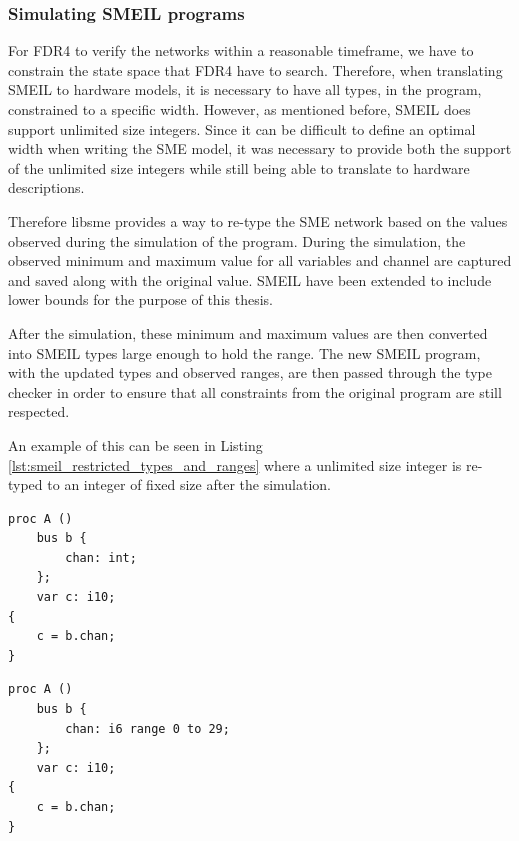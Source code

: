 \subsubsection{Simulating SMEIL programs}
For FDR4 to verify the networks within a reasonable timeframe, we have to constrain the state space that FDR4 have to search. Therefore, when translating SMEIL to hardware models, it is necessary to have all types, in the program, constrained to a specific width. However, as mentioned before, SMEIL does support unlimited size integers. Since it can be difficult to define an optimal width when writing the SME model, it was necessary to provide both the support of the unlimited size integers while still being able to translate to hardware descriptions.

Therefore libsme provides a way to re-type the SME network based on the values observed during the simulation of the program.
During the simulation, the observed minimum and maximum value for all variables and channel are captured and saved along with the original value. SMEIL have been extended to include lower bounds for the purpose of this thesis.

After the simulation, these minimum and maximum values are then converted into SMEIL types large enough to hold the range.
The new SMEIL program, with the updated types and observed ranges, are then passed through the type checker in order to ensure that all constraints from the original program are still respected.

An example of this can be seen in Listing \ref{lst:smeil_restricted_types_and_ranges} where a unlimited size integer is re-typed to an integer of fixed size after the simulation.\\
\begin{minipage}[t]{.98\linewidth}
  \begin{minipage}[t]{0.45\linewidth}
    \begin{verbatim}
proc A ()
    bus b {
        chan: int;
    };
    var c: i10;
{
    c = b.chan;
}
    \end{verbatim}
    \label{lst:unconstrained_smeil_type}
  \end{minipage}
  \hspace{0.5cm}
  \begin{minipage}[t]{0.45\linewidth}
    \begin{verbatim}
proc A ()
    bus b {
        chan: i6 range 0 to 29;
    };
    var c: i10;
{
    c = b.chan;
}
    \end{verbatim}
    \label{lst:constrained_smeil_type}
  \end{minipage}
    \vspace{0.5cm}
   \label{lst:smeil_restricted_types_and_rangesg}
   \vspace{1cm}
\end{minipage}
